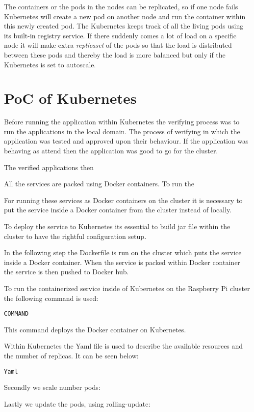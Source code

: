The containers or the pods in the nodes can be replicated, so if one node fails Kubernetes will create a new pod on another node and run the container within this newly created pod. The Kubernetes keeps track of all the living pods using its built-in registry service.  
If there suddenly comes a lot of load on a specific node it will make extra \emph{replicaset} of the pods so that the load is distributed between these pods and thereby the load is more balanced but only if the Kubernetes is set to autoscale. 

\section{PoC of Kubernetes}

Before running the application within Kubernetes the verifying process was to run the applications in the local domain. The process of verifying in which the application was tested and approved upon their behaviour. If the application was behaving as attend then the application was good to go for the cluster. 


The verified applications then 


All the services are packed using Docker containers. To run the  

For running these services as Docker containers on the cluster it is necessary to put the service inside a Docker container from the cluster instead of locally.

To deploy the service to Kubernetes its essential to build jar file within the cluster to have the rightful configuration setup.

In the following step the Dockerfile is run on the cluster which puts the service inside a Docker container. When the service is packed within Docker container the service is then pushed to Docker hub.   

To run the containerized service inside of Kubernetes on the Raspberry Pi cluster the following command is used:

\begin{lstlisting}
COMMAND 
\end{lstlisting}

This command deploys the Docker container on Kubernetes. 

Within Kubernetes the Yaml file is used to describe the available resources and the number of replicas. It can be seen below:

\begin{lstlisting}
Yaml
\end{lstlisting}


Secondly we scale number pods:

Lastly we update the pods, using rolling-update:





